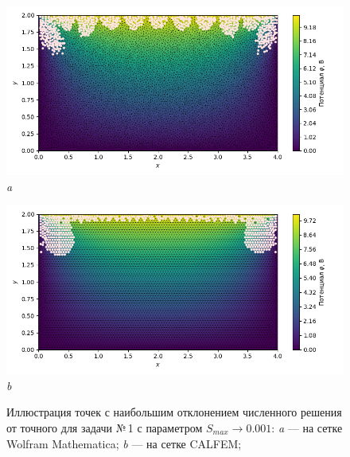 \documentclass[12pt, a4paper]{article}
\begin{document}
			
			\begin{figure}[!h]  
				\centering     
				\vspace{5.0mm} 
				\begin{center} 
					{ 
						\begin{minipage}{0.45\textwidth} 
							\centering 
							\hspace*{-32.7mm}
							\includegraphics[width=1.4\columnwidth]{rect_dirichlet_only_0001_err_nodes.png}\\ 
							\hspace*{-42.7mm}
							\textit{a} 
						\end{minipage}                                 
					} 
					{ 
						\begin{minipage}{0.45\textwidth} 
							\centering 
							\hspace*{-8.2mm}
							\includegraphics[width=1.4\columnwidth]{rect_dirichlet_only_0001_calfem_err_nodes.png}\\ 
							\hspace*{2.2mm}
							\textit{b} 
						\end{minipage}                                 
					} 
					
				\end{center} 
				\vspace*{-0.0mm} 
				\caption{Иллюстрация точек с наибольшим отклонением численного решения от точного для задачи №\,1 с параметром $S_{max} \rightarrow 0.001$: 
					\textit{a} --- на сетке Wolfram Mathematica;
					\textit{b} --- на сетке CALFEM;
				} 
				\label{fig: max_err_0001}
			\end{figure}
			
\end{document}
